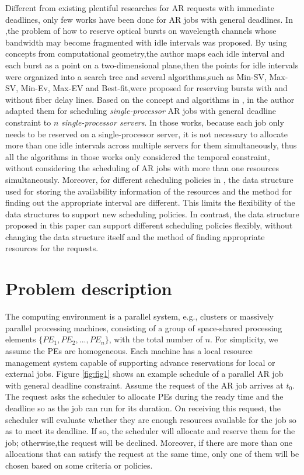 \documentclass[preprint,12pt]{elsarticle}
\begin{document}
Different from existing plentiful researches for AR requests with immediate deadlines, only few works have been done for AR jobs with general deadlines. In \cite{xu2004efficient},the problem of how to reserve optical bursts on wavelength channels whose bandwidth may become fragmented with idle intervals was proposed. By using concepts from computational geometry,the author maps each idle interval and each burst as a point on a two-dimensional plane,then the points for idle intervals were organized into a search tree and several algorithms,such as
Min-SV, Max-SV, Min-Ev, Max-EV and Best-fit,were proposed for reserving bursts with and without fiber delay lines. Based on the concept and algorithms in \cite{xu2004efficient}, in \cite{castillo2011online,castillo2007design}
the author adapted them for scheduling \emph{single-processor} AR jobs with general deadline constraint to $n$ \emph{single-processor servers}. In those works, because each job only needs to be reserved on a single-processor server, it is not necessary to allocate more than one idle intervals across multiple servers for them simultaneously, thus all the algorithms in those works only considered the temporal constraint, without considering the scheduling of AR jobs with more than one resources simultaneously. Moreover, for different scheduling policies in \cite{castillo2011online,castillo2007design}, the data structure used for storing the availability information of the resources and the method for finding out the appropriate interval are different. This limits the flexibility of the data structures to support new scheduling policies. In contrast, the data structure proposed in this paper can support different scheduling policies flexibly, without changing the data structure itself and the method of finding appropriate resources for the requests.


\section{Problem description}
\label{sec:model}
The computing environment is a parallel system, e.g., clusters or massively parallel processing machines, consisting of a group of space-shared processing elements $\{PE_1, PE_2, ..., PE_n\}$, with the total number of $n$. For simplicity, we assume the PEs are homogeneous. Each machine has a local resource management system capable of supporting advance reservations for local or external jobs.
Figure \ref{fig:fig1} shows an example schedule of a parallel AR job with general deadline constraint. Assume the request of the AR job arrives at $t_0$. The request asks the scheduler to allocate PEs during the ready time and the deadline so as the job can run for its duration. On receiving this request, the scheduler will evaluate  whether they are enough resources available for the job so as to meet its deadline. If so, the scheduler will allocate and reserve them for the job; otherwise,the request will be declined. Moreover, if there are more than one allocations that can satisfy the request at the same time, only one of them will be chosen based on some criteria or policies.
\end{document}
